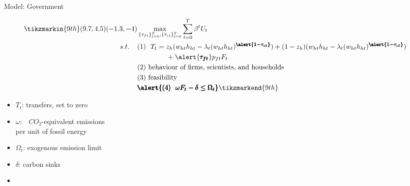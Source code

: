 \documentclass[11pt,aspectratio=169]{beamer}
\begin{document}
\addtocounter{framenumber}{-1}
\begin{frame}{Model: Government}
\begin{minipage}[t!]{1\textwidth}
	\begin{align*}
	\tikzmarkin{9th}(9.7,4.5)(-1.3,-4)
&\max_{\{\tau_{ft}\}_{t=0}^{T}, \{\tau_{\iota t}\}_{t=0}^{T}} \sum_{t=0}^{T}\beta^t U_{t}\\
s.t. \hspace{4mm}
&(1)\ \ T_t = z_h(w_{ht}h_{ht}-\lambda_t(w_{ht}h_{ht})^{\pmb{\alert{1-\tau_{\iota t}}}})+(1-z_h)(w_{ht}h_{ht}-\lambda_t(w_{ht}h_{ht})^{\pmb{\alert{1-\tau_{\iota t}}}})\\ & \hspace{15mm }+\alert{\pmb{\tau_{ft}}}p_{ft}F_{t}\\
& (2)\ \text{behaviour of firms, scientists, and households}\\
& (3)\ \text{feasibility} \\
&\pmb{\alert{
(4)\ \  \omega F_t-\delta \leq\Omega_t }
}	\tikzmarkend{9th}
	\end{align*}
\end{minipage}

\small
\vspace{-3mm}
\begin{minipage}[t!]{0.4\textwidth}
\vspace{7mm}
\begin{itemize}
	\item[] $T_t$: transfers, set to zero  \vspace{0mm}
	\item[] $\omega$:\ \ $CO_2$-equivalent emissions \\ \hspace{4mm} per unit of fossil energy
\end{itemize}
\end{minipage}
\begin{minipage}[t!]{0.4\textwidth}
\vspace{8mm}
\begin{itemize}
	\item[] $\Omega_{t}$: exogenous emission limit
	\vspace{0mm}	
		\item[] $\delta$: carbon sinks\vspace{-2mm}
		\item[] 
\end{itemize}
\end{minipage}

\end{frame}
\end{document}
